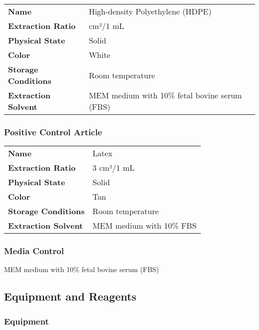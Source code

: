 \documentclass[
  12pt,
]{article}
\begin{document}
\begin{longtable}[]{@{}
  >{\raggedright\arraybackslash}p{}
  >{\raggedright\arraybackslash}p{}@{}}
\toprule\noalign{}
\endhead
\bottomrule\noalign{}
\endlastfoot
\textbf{Name} & High-density Polyethylene (HDPE) \\
\textbf{Extraction Ratio} & 3 cm²/1 mL \\
\textbf{Physical State} & Solid \\
\textbf{Color} & White \\
\textbf{Storage Conditions} & Room temperature \\
\textbf{Extraction Solvent} & MEM medium with 10\% fetal bovine serum
(FBS) \\
\end{longtable}

\subsubsection{Positive Control Article}\label{positive-control-article}

\begin{longtable}[]{@{}ll@{}}
\toprule\noalign{}
\endhead
\bottomrule\noalign{}
\endlastfoot
\textbf{Name} & Latex \\
\textbf{Extraction Ratio} & 3 cm²/1 mL \\
\textbf{Physical State} & Solid \\
\textbf{Color} & Tan \\
\textbf{Storage Conditions} & Room temperature \\
\textbf{Extraction Solvent} & MEM medium with 10\% FBS \\
\end{longtable}

\subsubsection{Media Control}\label{media-control}

MEM medium with 10\% fetal bovine serum (FBS)

\newpage

\subsection{Equipment and Reagents}\label{equipment-and-reagents}

\subsubsection{Equipment}\label{equipment}
\end{document}
